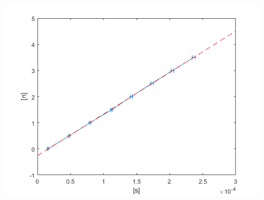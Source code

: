 \documentclass[12pt]{article}
\begin{document}
\includegraphics[scale=0.7]{data_03.png}
\end{document}
